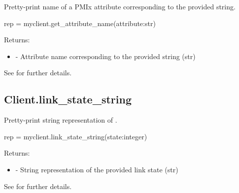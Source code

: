 \summary

Pretty-print name of a \ac{PMIx} attribute corresponding to the provided string.

\format

\pyspecificstart
\begin{codepar}
rep = myclient.get_attribute_name(attribute:str)
\end{codepar}
\pyspecificend

\begin{arglist}
\end{arglist}

Returns:
\begin{itemize}
    \item {} - Attribute name corresponding to the provided string (str)
\end{itemize}

See  for further details.


\subsection{Client.link_state_string}

\summary

Pretty-print string representation of .

\format

\pyspecificstart
\begin{codepar}
rep = myclient.link_state_string(state:integer)
\end{codepar}
\pyspecificend

\begin{arglist}
\end{arglist}

Returns:
\begin{itemize}
    \item {} - String representation of the provided link state (str)
\end{itemize}

See  for further details.



